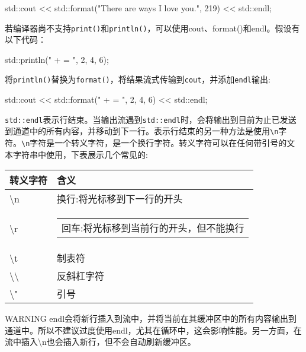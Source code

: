 \begin{cpp}
std::cout << std::format("There are {} ways I love you.", 219) << std::endl;
\end{cpp}

若编译器尚不支持\verb|print()|和\verb|println()|，可以使用cout、format()和endl。假设有以下代码：

\begin{cpp}
std::println("{} + {} = {}", 2, 4, 6);
\end{cpp}

将\verb|println()|替换为\verb|format()|，将结果流式传输到\verb|cout|，并添加\verb|endl|输出:

\begin{cpp}
std::cout << std::format("{} + {} = {}", 2, 4, 6) << std::endl;
\end{cpp}

\verb|std::endl|表示行结束。当输出流遇到\verb|std::endl|时，会将输出到目前为止已发送到通道中的所有内容，并移动到下一行。表示行结束的另一种方法是使用\verb|\n|字符。\verb|\n|字符是一个转义字符，是一个换行字符。转义字符可以在任何带引号的文本字符串中使用，下表展示几个常见的:

\begin{longtable}{|l|l|}
\hline
\textbf{转义字符}         & \textbf{含义}                                             \\ \hline
\endfirsthead
%
\endhead
%
\textbackslash{}n                & 换行:将光标移到下一行的开头 \\ \hline
\textbackslash{}r &
\begin{tabular}[c]{@{}l@{}}回车:将光标移到当前行的开头，但不能换行\end{tabular} \\ \hline
\textbackslash{}t                & 制表符                                                          \\ \hline
\textbackslash{}\textbackslash{} & 反斜杠字符                                          \\ \hline
\textbackslash{}"                & 引号                                               \\ \hline
\end{longtable}

\begin{myWarning}{WARNING}
endl会将新行插入到流中，并将当前在其缓冲区中的所有内容输出到通道中。所以不建议过度使用endl，尤其在循环中，这会影响性能。另一方面，在流中插入\textbackslash{}n也会插入新行，但不会自动刷新缓冲区。
\end{myWarning}

